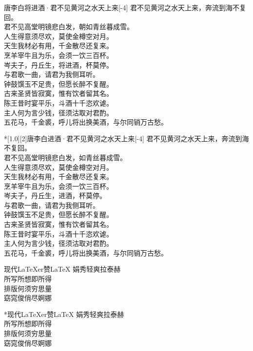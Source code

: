 \documentclass{ctexart}
\begin{document}
\centering

\begin{poem}[1.0][2]{唐}{李白}{将进酒·君不见黄河之水天上来}[-4]
君不见黄河之水天上来，奔流到海不复回。\\
君不见高堂明镜悲白发，朝如青丝暮成雪。\\
人生得意须尽欢，莫使金樽空对月。\\
天生我材必有用，千金散尽还复来。\\
烹羊宰牛且为乐，会须一饮三百杯。\\
岑夫子，丹丘生，将进酒，杯莫停。\\
与君歌一曲，请君为我侧耳听。\\
钟鼓馔玉不足贵，但愿长醉不复醒。\\
古来圣贤皆寂寞，惟有饮者留其名。\\
陈王昔时宴平乐，斗酒十千恣欢谑。\\
主人何为言少钱，径须沽取对君酌。\\
五花马，千金裘，呼儿将出换美酒，与尔同销万古愁。
\end{poem}

\begin{poem}*[1.0][2]{唐}{李白}{进酒·君不见黄河之水天上来}[-4]
君不见黄河之水天上来，奔流到海不复回。\\
君不见高堂明镜悲白发，如青丝暮成雪。\\
人生得意须尽欢，莫使金樽空对月。\\
天生我材必有用，千金散尽还复来。\\
烹羊宰牛且为乐，会须一饮三百杯。\\
岑夫子，丹丘生，进酒，杯莫停。\\
与君歌一曲，请君为我侧耳听。\\
钟鼓馔玉不足贵，但愿长醉不复醒。\\
古来圣贤皆寂寞，惟有饮者留其名。\\
陈王昔时宴平乐，斗酒十千恣欢谑。\\
主人何为言少钱，径须沽取对君酌。\\
五花马，千金裘，呼儿将出换美酒，与尔同销万古愁。
\end{poem}

  \begin{poem}{现代}{\LaTeX{}er}{赞\textbullet{}\LaTeX{}}
    娟秀轻爽拉泰赫\\
    所写所想即所得\\
    排版何须穷思量\\
    窈窕俊俏尽婀娜
  \end{poem}
  
  \begin{poem}*{现代}{\LaTeX{}er}{赞\textbullet{}\LaTeX{}}
    娟秀轻爽拉泰赫\\
    所写所想即所得\\
    排版何须穷思量\\
    窈窕俊俏尽婀娜
  \end{poem}
\end{document}
